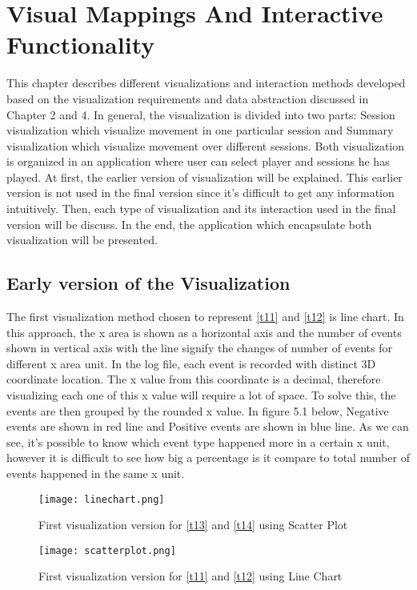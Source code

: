 \chapter{Visual Mappings And Interactive Functionality}
This chapter describes different visualizations and interaction methods developed based on the visualization requirements and data abstraction discussed in Chapter 2 and 4. In general, the visualization is divided into two parts: Session visualization which visualize movement in one particular session and Summary visualization which visualize movement over different sessions. Both visualization is organized in an application where user can select player and sessions he has played. At first, the earlier version of visualization will be explained. This earlier version is not used in the final version since it's difficult to get any information intuitively. Then, each type of visualization and its interaction used in the final version will be discuss. In the end, the application which encapsulate both visualization will be presented.

\section{Early version of the Visualization}
The first visualization method chosen to represent \ref{t11} and \ref{t12} is line chart. In this approach, the x area is shown as a horizontal axis and the number of events shown in vertical axis with the line signify the changes of number of events for different x area unit. In the log file, each event is recorded with distinct 3D coordinate location. The x value from this coordinate is a decimal, therefore visualizing each one of this x value will require a lot of space. To solve this, the events are then grouped by the rounded x value. In figure 5.1 below, Negative events are shown in red line and Positive events are shown in blue line. As we can see, it's possible to know which event type happened more in a certain x unit, however it is difficult to see how big a percentage is it compare to total number of events happened in the same x unit.

\begin{figure}
\centering
\texttt{[image: linechart.png]}
\caption{First visualization version for \ref{t13} and \ref{t14} using Scatter Plot}
\end{figure}

\begin{figure}
\centering
\texttt{[image: scatterplot.png]}
\caption{First visualization version for \ref{t11} and \ref{t12} using Line Chart}
\end{figure}


